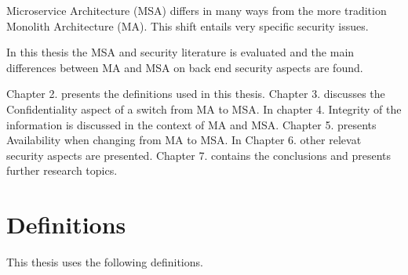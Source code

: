 \begin{sloppypar}
    Microservice Architecture (MSA) differs in many ways from 
    the more tradition Monolith Architecture (MA). This shift entails very 
    specific security issues.
\end{sloppypar}
\begin{sloppypar}
    In this thesis the MSA and security literature is evaluated and the main 
    differences between MA and MSA on back end security aspects are found.
\end{sloppypar}
\begin{sloppypar}
    Chapter 2. presents the definitions used in this thesis. 
    Chapter 3. discusses the Confidentiality aspect of a switch from MA to MSA. 
    In chapter 4. Integrity of the information is discussed in the context of 
    MA and MSA. 
    Chapter 5. presents Availability when changing from MA to MSA.
    In Chapter 6. other relevat security aspects are presented.
    Chapter 7. contains the conclusions and presents further research topics.
\end{sloppypar}

\section{Definitions}
\begin{sloppypar}
    This thesis uses the following definitions.
\end{sloppypar}



